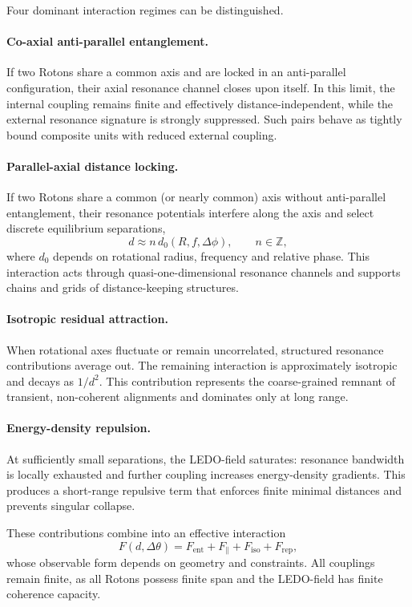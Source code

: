 \documentclass[11pt,a4paper]{article}
\begin{document}
Four dominant interaction regimes can be distinguished.

\paragraph{Co-axial anti-parallel entanglement.}
If two Rotons share a common axis and are locked in an anti-parallel configuration, their
axial resonance channel closes upon itself. In this limit, the internal coupling remains
finite and effectively distance-independent, while the external resonance signature is
strongly suppressed. Such pairs behave as tightly bound composite units with reduced
external coupling.

\paragraph{Parallel-axial distance locking.}
If two Rotons share a common (or nearly common) axis without anti-parallel entanglement,
their resonance potentials interfere along the axis and select discrete equilibrium
separations,
\[
d \approx n\,d_0(R,f,\Delta\phi), \qquad n\in\mathbb{Z},
\]
where $d_0$ depends on rotational radius, frequency and relative phase. This interaction
acts through quasi-one-dimensional resonance channels and supports chains and grids of
distance-keeping structures.

\paragraph{Isotropic residual attraction.}
When rotational axes fluctuate or remain uncorrelated, structured resonance contributions
average out. The remaining interaction is approximately isotropic and decays as $1/d^2$.
This contribution represents the coarse-grained remnant of transient, non-coherent
alignments and dominates only at long range.

\paragraph{Energy-density repulsion.}
At sufficiently small separations, the LEDO-field saturates: resonance bandwidth is locally
exhausted and further coupling increases energy-density gradients. This produces a short-range
repulsive term that enforces finite minimal distances and prevents singular collapse.

These contributions combine into an effective interaction
\[
F(d,\Delta\theta)=F_{\mathrm{ent}}+F_{\parallel}+F_{\mathrm{iso}}+F_{\mathrm{rep}},
\]
whose observable form depends on geometry and constraints. All couplings remain finite,
as all Rotons possess finite span and the LEDO-field has finite coherence capacity.
\end{document}

